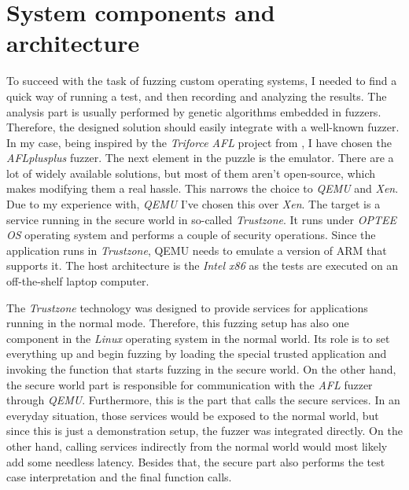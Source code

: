 \cleardoublepage
\section{System components and architecture} \label{chap:why}
To succeed with the task of fuzzing custom operating systems, I needed to find a quick way of running a test, and then recording and analyzing the results. The analysis part is usually performed by genetic algorithms embedded in fuzzers. Therefore, the designed solution should easily integrate with a well-known fuzzer. In my case, being inspired by the \textit{Triforce AFL} project from \cite{triforceafl}, I have chosen the \textit{AFLplusplus} fuzzer. The next element in the puzzle is the emulator. There are a lot of widely available solutions, but most of them aren't open-source, which makes modifying them a real hassle. This narrows the choice to \textit{QEMU} and \textit{Xen}. Due to my experience with, \textit{QEMU} I've chosen this over \textit{Xen}. The target is a service running in the secure world in so-called \textit{Trustzone}. It runs under \textit{OPTEE OS} operating system and performs a couple of security operations. Since the application runs in \textit{Trustzone}, QEMU needs to emulate a version of ARM that supports it. The host architecture is the \textit{Intel x86} as the tests are executed on an off-the-shelf laptop computer. 

The \textit{Trustzone} technology was designed to provide services for applications running in the normal mode. Therefore, this fuzzing setup has also one component in the \textit{Linux} operating system in the normal world. Its role is to set everything up and begin fuzzing by loading the special trusted application and invoking the function that starts fuzzing in the secure world. On the other hand, the secure world part is responsible for communication with the \textit{AFL} fuzzer through \textit{QEMU}. Furthermore, this is the part that calls the secure services. In an everyday situation, those services would be exposed to the normal world, but since this is just a demonstration setup, the fuzzer was integrated directly. On the other hand, calling services indirectly from the normal world would most likely add some needless latency. Besides that, the secure part also performs the test case interpretation and the final function calls. 

